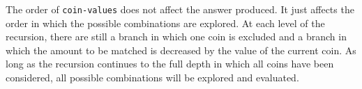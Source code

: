 \documentclass{article}
\begin{document}


The order of \texttt{coin-values} does not affect the answer produced. It just
affects the order in which the possible combinations are explored. At each level
of the recursion, there are still a branch in which one coin is excluded and a
branch in which the amount to be matched is decreased by the value of the
current coin. As long as the recursion continues to the full depth in which all
coins have been considered, all possible combinations will be explored and
evaluated.
\end{document}
